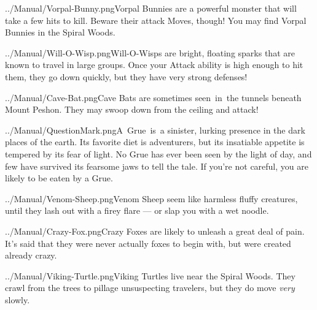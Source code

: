 \documentclass[9pt,twocolumn,openany,article]{memoir}
\newcommand\englishskip{\vspace{14pt}}
\begin{document}
{\lettrine[image=true,                lines=3,               findent=3pt,
nindent=3pt]{../Manual/Vorpal-Bunny.png}{}\noindent{}Vorpal  Bunnies are
a  powerful monster  that will  take a  few hits  to kill.  Beware their
attack Moves, though! You may find Vorpal Bunnies in the Spiral Woods.

\englishskip

\lettrine[image=true,                lines=3,               findent=3pt,
nindent=3pt]{../Manual/Will-O-Wisp.png}{}\noindent{}Will-O-Wisps     are
bright,  floating sparks  that  are  known to  travel  in large  groups.
Once  your Attack  ability is  high  enough to  hit them,  they go  down
quickly, but they have very strong defenses!

\englishskip

\lettrine[image=true,                lines=3,               findent=3pt,
nindent=3pt]{../Manual/Cave-Bat.png}{}\noindent{}Cave Bats are sometimes
seen~in~the tunnels beneath  Mount Peshon. They may swoop  down from the
ceiling and attack!

\englishskip

\lettrine[image=true,                lines=3,               findent=3pt,
nindent=3pt]{../Manual/QuestionMark.png}{}\noindent{}A~Grue~is~a
sinister, lurking presence in the dark places of the earth. Its favorite
diet is adventurers, but its insatiable appetite is tempered by its fear
of light. No Grue  has ever been seen by the light of  day, and few have
survived its fearsome jaws to tell  the tale. If you're not careful, you
are likely to be eaten by a Grue.

\englishskip

\lettrine[image=true,                lines=3,               findent=3pt,
nindent=3pt]{../Manual/Venom-Sheep.png}{}\noindent{}Venom   Sheep   seem
like  harmless  fluffy creatures,  until  they  lash  out with  a  firey
flare --- or slap you with a wet noodle.

\englishskip

\lettrine[image=true,                lines=3,               findent=3pt,
nindent=3pt]{../Manual/Crazy-Fox.png}{}\noindent{}Crazy Foxes are likely
to unleash a great deal of pain. It's said that they were never actually
foxes to begin with, but were created already crazy.

\englishskip

\lettrine[image=true,                lines=3,               findent=3pt,
nindent=3pt]{../Manual/Viking-Turtle.png}{}\noindent{}Viking     Turtles
live  near the  Spiral  Woods.  They crawl  from  the  trees to  pillage
unsuspecting travelers, but they do move \emph{very} slowly.

}
\end{document}
